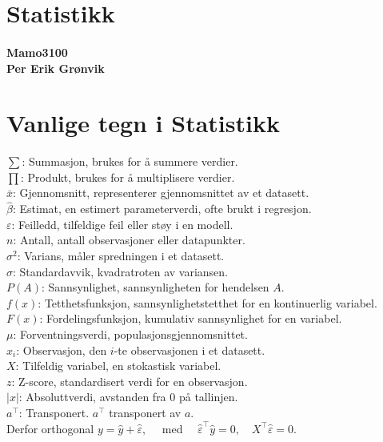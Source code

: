 \documentclass[a4paper,7pt,fleqn]{article}
\begin{document}
\section{Statistikk}
\begin{multicols}{2}
    \paragraph{\large Mamo3100 \\ \tiny Per Erik Grønvik }
    
    
    \section*{Vanlige tegn i Statistikk}
    
    \(\sum\): Summasjon, brukes for å summere verdier.\\
    \(\prod\): Produkt, brukes for å multiplisere verdier.\\
    \(\bar{x}\): Gjennomsnitt, representerer gjennomsnittet av et datasett.\\
    \(\hat{\beta}\): Estimat, en estimert parameterverdi, ofte brukt i regresjon.\\
    \(\varepsilon\): Feilledd, tilfeldige feil eller støy i en modell.\\
    \(n\): Antall, antall observasjoner eller datapunkter.\\
    \(\sigma^2\): Varians, måler spredningen i et datasett.\\
    \(\sigma\): Standardavvik, kvadratroten av variansen.\\
    \(P(A)\): Sannsynlighet, sannsynligheten for hendelsen \(A\).\\
    \(f(x)\): Tetthetsfunksjon, sannsynlighetstetthet for en kontinuerlig variabel.\\
    \(F(x)\): Fordelingsfunksjon, kumulativ sannsynlighet for en variabel.\\
    \(\mu\): Forventningsverdi, populasjonsgjennomsnittet.\\
    \(x_i\): Observasjon, den \(i\)-te observasjonen i et datasett.\\
    \(X\): Tilfeldig variabel, en stokastisk variabel.\\
    \(z\): Z-score, standardisert verdi for en observasjon.\\
    \(|x|\): Absoluttverdi, avstanden fra 0 på tallinjen.\\
    \(a^\top\): Transponert. \(a^\top\) transponert av \(a\).\\
    Derfor orthogonal \( y = \hat{y} + \hat{\varepsilon}, \quad \) med \( \quad \hat{\varepsilon}^\top \hat{y} = 0, \quad X^\top \hat{\varepsilon} = 0. \)
    



\end{multicols}
\end{document}
